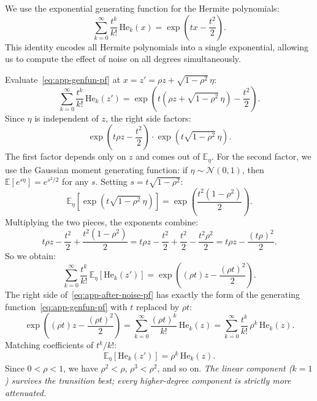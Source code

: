 We use the exponential generating function for the Hermite polynomials:
\begin{equation}\label{eq:app-genfun-pf}
    \sum_{k=0}^\infty \frac{t^k}{k!}\,\mathrm{He}_k(x) = \exp\!\left(tx - \frac{t^2}{2}\right).
\end{equation}
This identity encodes all Hermite polynomials into a single exponential, allowing us to compute the effect of noise on all degrees simultaneously.

Evaluate~\eqref{eq:app-genfun-pf} at $x = z' = \rho z + \sqrt{1-\rho^2}\,\eta$:
\begin{equation}
    \sum_{k=0}^\infty \frac{t^k}{k!}\,\mathrm{He}_k(z') = \exp\!\left(t(\rho z + \sqrt{1-\rho^2}\,\eta) - \frac{t^2}{2}\right).
\end{equation}
Since $\eta$ is independent of $z$, the right side factors:
\begin{equation}
    \exp\!\left(t\rho z - \frac{t^2}{2}\right) \cdot \exp\!\left(t\sqrt{1-\rho^2}\,\eta\right).
\end{equation}
The first factor depends only on $z$ and comes out of $\mathbb{E}_\eta$.
For the second factor, we use the Gaussian moment generating function: if $\eta \sim \mathcal{N}(0,1)$, then $\mathbb{E}[e^{s\eta}] = e^{s^2/2}$ for any $s$.
Setting $s = t\sqrt{1-\rho^2}$:
\begin{equation}
    \mathbb{E}_\eta\!\left[\exp\!\left(t\sqrt{1-\rho^2}\,\eta\right)\right] = \exp\!\left(\frac{t^2(1-\rho^2)}{2}\right).
\end{equation}
Multiplying the two pieces, the exponents combine:
\begin{equation}
    t\rho z - \frac{t^2}{2} + \frac{t^2(1-\rho^2)}{2} = t\rho z - \frac{t^2}{2} + \frac{t^2}{2} - \frac{t^2\rho^2}{2} = t\rho z - \frac{(t\rho)^2}{2}.
\end{equation}
So we obtain:
\begin{equation}\label{eq:app-after-noise-pf}
    \sum_{k=0}^\infty \frac{t^k}{k!}\,\mathbb{E}_\eta\!\left[\mathrm{He}_k(z')\right] = \exp\!\left((\rho t) z - \frac{(\rho t)^2}{2}\right).
\end{equation}
The right side of~\eqref{eq:app-after-noise-pf} has exactly the form of the generating function~\eqref{eq:app-genfun-pf} with $t$ replaced by $\rho t$:
\begin{equation}
    \exp\!\left((\rho t) z - \frac{(\rho t)^2}{2}\right) = \sum_{k=0}^\infty \frac{(\rho t)^k}{k!}\,\mathrm{He}_k(z) = \sum_{k=0}^\infty \frac{t^k}{k!}\,\rho^k\,\mathrm{He}_k(z).
\end{equation}
Matching coefficients of $t^k/k!$:
\begin{equation}\label{eq:contraction-result}
    \mathbb{E}_\eta\!\left[\mathrm{He}_k(z')\right] = \rho^k\,\mathrm{He}_k(z).
\end{equation}
Since $0 < \rho < 1$, we have $\rho^2 < \rho$, $\rho^3 < \rho^2$, and so on.
\textit{The linear component ($k=1$) survives the transition best; every higher-degree component is strictly more attenuated.}

